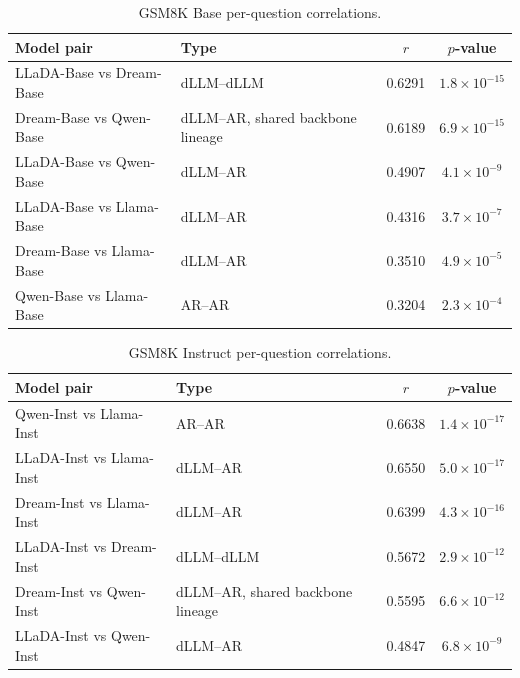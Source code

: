 \begin{table}[H]
\centering
\caption{GSM8K Base per-question correlations.}
\label{tab:gsm8k-base-corr}
\scriptsize
\begin{tabular}{llcc}
\toprule
\textbf{Model pair} & \textbf{Type} & \textbf{$r$} & \textbf{$p$-value} \\
\midrule
LLaDA-Base vs Dream-Base & dLLM--dLLM & 0.6291 & $1.8\times10^{-15}$ \\
Dream-Base vs Qwen-Base & dLLM--AR, shared backbone lineage & 0.6189 & $6.9\times10^{-15}$ \\
LLaDA-Base vs Qwen-Base & dLLM--AR & 0.4907 & $4.1\times10^{-9}$ \\
LLaDA-Base vs Llama-Base & dLLM--AR & 0.4316 & $3.7\times10^{-7}$ \\
Dream-Base vs Llama-Base & dLLM--AR & 0.3510 & $4.9\times10^{-5}$ \\
Qwen-Base vs Llama-Base & AR--AR & 0.3204 & $2.3\times10^{-4}$ \\
\bottomrule
\end{tabular}
\end{table}

\begin{table}[H]
\centering
\caption{GSM8K Instruct per-question correlations.}
\label{tab:gsm8k-inst-corr}
\scriptsize
\begin{tabular}{llcc}
\toprule
\textbf{Model pair} & \textbf{Type} & \textbf{$r$} & \textbf{$p$-value} \\
\midrule
Qwen-Inst vs Llama-Inst & AR--AR & 0.6638 & $1.4\times10^{-17}$ \\
LLaDA-Inst vs Llama-Inst & dLLM--AR & 0.6550 & $5.0\times10^{-17}$ \\
Dream-Inst vs Llama-Inst & dLLM--AR & 0.6399 & $4.3\times10^{-16}$ \\
LLaDA-Inst vs Dream-Inst & dLLM--dLLM & 0.5672 & $2.9\times10^{-12}$ \\
Dream-Inst vs Qwen-Inst & dLLM--AR, shared backbone lineage & 0.5595 & $6.6\times10^{-12}$ \\
LLaDA-Inst vs Qwen-Inst & dLLM--AR & 0.4847 & $6.8\times10^{-9}$ \\
\bottomrule
\end{tabular}
\end{table}

